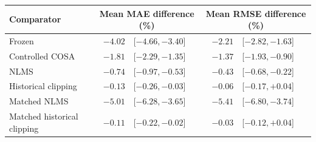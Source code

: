 \begin{tabular}{lr@{\enspace}lr@{\enspace}l}
\toprule
Comparator & \multicolumn{2}{c}{Mean MAE difference (\%)} & \multicolumn{2}{c}{Mean RMSE difference (\%)}\\
\midrule
Frozen & $-4.02$ & [$-4.66, -3.40$] & $-2.21$ & [$-2.82, -1.63$]\\
Controlled COSA & $-1.81$ & [$-2.29, -1.35$] & $-1.37$ & [$-1.93, -0.90$]\\
NLMS & $-0.74$ & [$-0.97, -0.53$] & $-0.43$ & [$-0.68, -0.22$]\\
Historical clipping & $-0.13$ & [$-0.26, -0.03$] & $-0.06$ & [$-0.17, +0.04$]\\
\addlinespace[3pt]
Matched NLMS & $-5.01$ & [$-6.28, -3.65$] & $-5.41$ & [$-6.80, -3.74$]\\
Matched historical clipping & $-0.11$ & [$-0.22, -0.02$] & $-0.03$ & [$-0.12, +0.04$]\\
\bottomrule
\end{tabular}
